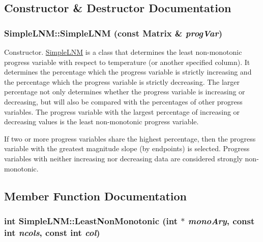 \subsection{Constructor \& Destructor Documentation}
\hypertarget{classSimpleLNM_a45bd676f6bb504baf1b46ddcbf2f8fb8}{
\subsubsection[{SimpleLNM}]{\setlength{\rightskip}{0pt plus 5cm}SimpleLNM::SimpleLNM (const {\bf Matrix} \& {\em progVar})}}
\label{d8/dfe/classSimpleLNM_a45bd676f6bb504baf1b46ddcbf2f8fb8}


Constructor. \hyperlink{classSimpleLNM}{SimpleLNM} is a class that determines the least non-\/monotonic progress variable with respect to temperature (or another specified column). It determines the percentage which the progress variable is strictly increasing and the percentage which the progress variable is strictly decreasing. The larger percentage not only determines whether the progress variable is increasing or decreasing, but will also be compared with the percentages of other progress variables. The progress variable with the largest percentage of increasing or decreasing values is the least non-\/monotonic progress variable.

If two or more progress variables share the highest percentage, then the progress variable with the greatest magnitude slope (by endpoints) is selected. Progress variables with neither increasing nor decreasing data are considered strongly non-\/monotonic. 

\subsection{Member Function Documentation}
\hypertarget{classSimpleLNM_a9d296839ca84467c0f6241b1393bd6d5}{
\subsubsection[{LeastNonMonotonic}]{\setlength{\rightskip}{0pt plus 5cm}int SimpleLNM::LeastNonMonotonic (int $\ast$ {\em monoAry}, \/  const int {\em ncols}, \/  const int {\em col})}}
\label{d8/dfe/classSimpleLNM_a9d296839ca84467c0f6241b1393bd6d5}



